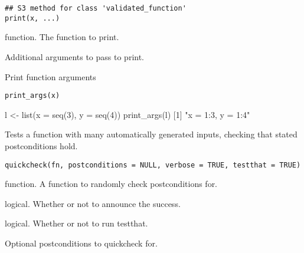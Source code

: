 \documentclass[a4paper]{book}
\begin{document}
%
\begin{Usage}
\begin{verbatim}
## S3 method for class 'validated_function'
print(x, ...)
\end{verbatim}
\end{Usage}
%
\begin{Arguments}
\begin{ldescription}
\item[\code{x}] function. The function to print.

\item[\code{...}] Additional arguments to pass to print.
\end{ldescription}
\end{Arguments}
%
\begin{Description}\relax
Print function arguments
\end{Description}
%
\begin{Usage}
\begin{verbatim}
print_args(x)
\end{verbatim}
\end{Usage}
%
\begin{Examples}
\begin{ExampleCode}
l <- list(x = seq(3), y = seq(4))
print_args(l)
[1] "x = 1:3, y = 1:4"
\end{ExampleCode}
\end{Examples}
%
\begin{Description}\relax
Tests a function with many automatically generated inputs, checking that stated
postconditions hold.
\end{Description}
%
\begin{Usage}
\begin{verbatim}
quickcheck(fn, postconditions = NULL, verbose = TRUE, testthat = TRUE)
\end{verbatim}
\end{Usage}
%
\begin{Arguments}
\begin{ldescription}
\item[\code{fn}] function. A function to randomly check postconditions for.

\item[\code{verbose}] logical. Whether or not to announce the success.

\item[\code{testthat}] logical. Whether or not to run testthat.

\item[\code{postconditions.}] Optional postconditions to quickcheck for.
\end{ldescription}
\end{Arguments}
\end{document}
